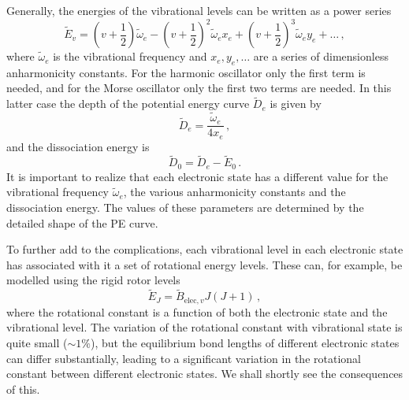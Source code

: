 \documentclass{article}
\theoremstyle{plain}\theoremheaderfont{\normalfont\itshape}\theorembodyfont{\rmfamily}\theoremseparator{.}\newtheorem*{rem}{Remark}\newtheorem*{ex}{Example}\newtheorem*{proof}{Proof}\newtheorem*{altp}{Alternative proof}
\theoremstyle{plain}\theoremheaderfont{\normalfont\bfseries}\theorembodyfont{\rmfamily}\theoremseparator{.}\newtheorem{thm}{Theorem}[section]\newtheorem{lem}[thm]{Lemma}\newtheorem{prop}[thm]{Proposition}\newtheorem*{cor}{Corollary}\newtheorem{defn}[thm]{Definition}\newtheorem{clm}[thm]{Claim}\newtheorem{clminproof}{Claim}\newtheorem{pos}{Postulate}[section]
\theoremstyle{break}\theoremheaderfont{\normalfont\itshape}\theorembodyfont{\rmfamily}\theoremseparator{.\medskip}\newtheorem*{proofskip}{Proof}\newtheorem*{exs}{Examples}\newtheorem*{rems}{Remarks}
\theoremstyle{break}\theoremheaderfont{\normalfont\bfseries}\theorembodyfont{\rmfamily}\theoremseparator{.\medskip}\newtheorem{lemskip}[thm]{Lemma}\newtheorem{defnskip}[thm]{Definition}\newtheorem{propskip}[thm]{Proposition}\newtheorem{thmskip}[thm]{Theorem}
\numberwithin{equation}{section}
\begin{document}
    Generally, the energies of the vibrational levels can be written as a power series
    \begin{equation}
        \tilde{E}_v=\left(v+\frac{1}{2}\right)\tilde{\omega}_e-\left(v+\frac{1}{2}\right)^2\tilde{\omega}_e x_e+\left(v+\frac{1}{2}\right)^3\tilde{\omega}_e y_e +\dots\,,
    \end{equation}
    where \(\tilde{\omega}_e\) is the vibrational frequency and \(x_e,y_e,\dots\) are a series of dimensionless anharmonicity constants. For the harmonic oscillator only the first term is needed, and for the Morse oscillator only the first two terms are needed. In this latter case the depth of the potential energy curve \(\tilde{D}_e\) is given by
    \begin{equation}
        \tilde{D}_e=\frac{\tilde{\omega}_e}{4x_e}\,,
    \end{equation}
    and the dissociation energy is
    \begin{equation}
        \tilde{D}_0=\tilde{D}_e-\tilde{E}_0\,.
    \end{equation}
    It is important to realize that each electronic state has a different value for the vibrational frequency \(\tilde{\omega}_e\), the various anharmonicity constants and the dissociation energy. The values of these parameters are determined by the detailed shape of the PE curve.

    To further add to the complications, each vibrational level in each electronic state has associated with it a set of rotational energy levels. These can, for example, be modelled using the rigid rotor levels
    \begin{equation}
        \tilde{E}_J=\tilde{B}_{\text{elec},v}J(J+1)\,,
    \end{equation}
    where the rotational constant is a function of both the electronic state and the vibrational level. The variation of the rotational constant with vibrational state is quite small (\(\sim 1\%\)), but the equilibrium bond lengths of different electronic states can differ substantially, leading to a significant variation in the rotational constant between different electronic states. We shall shortly see the consequences of this.
\end{document}
